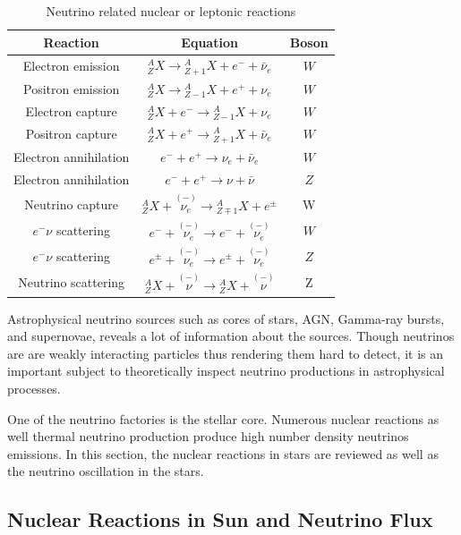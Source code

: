 \documentclass[%
 aip,
 jmp,%
 amsmath,amssymb,
 reprint,%
]{revtex4-1}
\begin{document}
\begin{table}[ht]
\centering
 \begin{tabular}{|c | c | c|} 
 \hline
 Reaction & Equation & Boson   \\ [0.5ex] 
 \hline
 Electron emission & ${}^A_Z X \to {}^A_{Z+1}X + e^- +\bar \nu_e$ & $W$  \\ 
 Positron emission & ${}^A_Z X \to {}^A_{Z-1}X + e^+ + \nu_e$ & $W$  \\
 Electron capture & ${}^A_Z X + e^- \to {}^A_{Z-1}X  + \nu_e$ &  $W$ \\
 Positron capture & ${}^A_Z X + e^+ \to {}^A_{Z+1}X  + \bar\nu_e$ &  $W$ \\
 [0.5ex] 
 \hline

 Electron annihilation &  $e^- + e^+  \to \nu_e + \bar\nu_e $  & $W$ \\
 Electron annihilation &  $e^- + e^+  \to \nu + \bar\nu $  & $Z$ \\
 [0.5ex] 
 \hline

  Neutrino capture & ${}^A_{Z}X + \overset{(-)}{\nu_e} \to {}^A_{Z\mp 1}X + e^\pm $ & W\\
  [1ex] 
 \hline
 $e^-\nu$ scattering & $e^- + \overset{(-)}{\nu_e} \to e^- + \overset{(-)}{\nu_e} $ &  $W$ \\
 $e^-\nu$ scattering & $e^{\pm} + \overset{(-)}{\nu_e} \to e^{\pm} + \overset{(-)}{\nu_e} $ &  $Z$ \\
 Neutrino scattering & $ {}^A_Z X + \overset{(-)}{\nu} \to {}^A_Z X + \overset{(-)}{\nu} $ &  Z\\
 [0.5ex] 
 \hline
 \end{tabular}
 \caption{Neutrino related nuclear or leptonic reactions}
\label{table:Neutrino_Reactions}
\end{table}

Astrophysical neutrino sources such as cores of stars, AGN, Gamma-ray bursts, and supernovae, reveals a lot of information about the sources. Though neutrinos are are weakly interacting particles thus rendering them hard to detect, it is an important subject to theoretically inspect neutrino productions in astrophysical processes.

One of the neutrino factories is the stellar core. Numerous nuclear reactions as well thermal neutrino production produce high number density neutrinos emissions. In this section, the nuclear reactions in stars are reviewed as well as the neutrino oscillation in the stars.



\subsection{Nuclear Reactions in Sun and Neutrino Flux}
\end{document}

